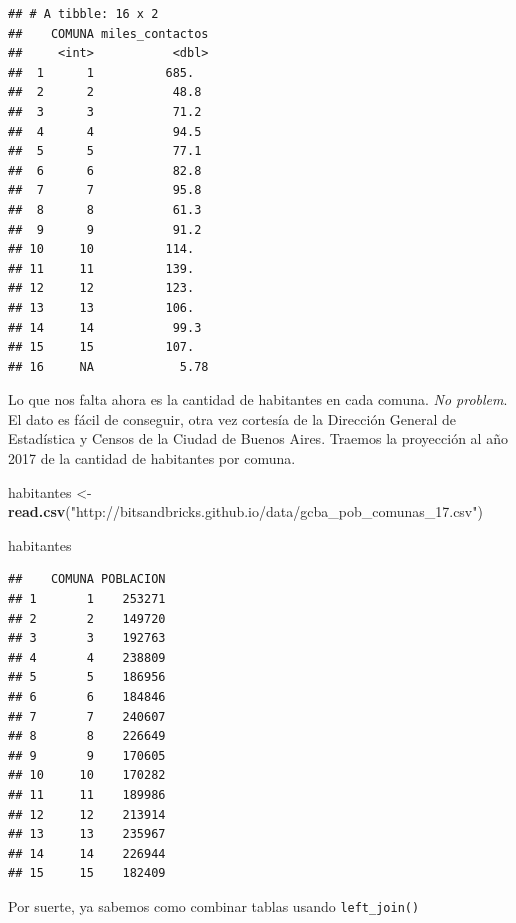 \documentclass[]{book}
\newenvironment{Shaded}{\begin{snugshade}}{\end{snugshade}}
\newcommand{\KeywordTok}[1]{\textcolor[rgb]{0.13,0.29,0.53}{\textbf{#1}}}
\newcommand{\StringTok}[1]{\textcolor[rgb]{0.31,0.60,0.02}{#1}}
\newcommand{\OperatorTok}[1]{\textcolor[rgb]{0.81,0.36,0.00}{\textbf{#1}}}
\newcommand{\NormalTok}[1]{#1}
\begin{document}
\begin{verbatim}
## # A tibble: 16 x 2
##    COMUNA miles_contactos
##     <int>           <dbl>
##  1      1          685.  
##  2      2           48.8 
##  3      3           71.2 
##  4      4           94.5 
##  5      5           77.1 
##  6      6           82.8 
##  7      7           95.8 
##  8      8           61.3 
##  9      9           91.2 
## 10     10          114.  
## 11     11          139.  
## 12     12          123.  
## 13     13          106.  
## 14     14           99.3 
## 15     15          107.  
## 16     NA            5.78
\end{verbatim}

Lo que nos falta ahora es la cantidad de habitantes en cada comuna.
\emph{No problem}. El dato es fácil de conseguir, otra vez cortesía de
la Dirección General de Estadística y Censos de la Ciudad de Buenos
Aires. Traemos la proyección al año 2017 de la cantidad de habitantes
por comuna.

\begin{Shaded}
\begin{Highlighting}[]
\NormalTok{habitantes <-}\StringTok{ }\KeywordTok{read.csv}\NormalTok{(}\StringTok{"http://bitsandbricks.github.io/data/gcba_pob_comunas_17.csv"}\NormalTok{)}

\NormalTok{habitantes}
\end{Highlighting}
\end{Shaded}

\begin{verbatim}
##    COMUNA POBLACION
## 1       1    253271
## 2       2    149720
## 3       3    192763
## 4       4    238809
## 5       5    186956
## 6       6    184846
## 7       7    240607
## 8       8    226649
## 9       9    170605
## 10     10    170282
## 11     11    189986
## 12     12    213914
## 13     13    235967
## 14     14    226944
## 15     15    182409
\end{verbatim}

Por suerte, ya sabemos como combinar tablas usando \texttt{left\_join()}

\begin{Shaded}
\end{Shaded}
\end{document}
